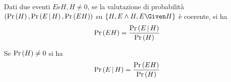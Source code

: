 \documentclass{subfiles}
\begin{document}
\begin{Theorem}
    Dati due eventi \(E \text{e} H, H \neq 0\), se la valutazione di probabilità \((\Prob{H}, \Prob{E}[H], \Prob{EH})\) su \(\Set{H, E \land H, E \Given H}\) è coerente,
    si ha
    \[
        \Prob{EH} = \Frac{\Prob{E}[H]}{\Prob{H}}
    \]
\end{Theorem}
\begin{Corollary}
    Se \(\Prob{H} \neq 0\) si ha
    \[
        \Prob{E}[H] = \Frac{\Prob{EH}}{\Prob{H}}
    \]
\end{Corollary}
\end{document}
